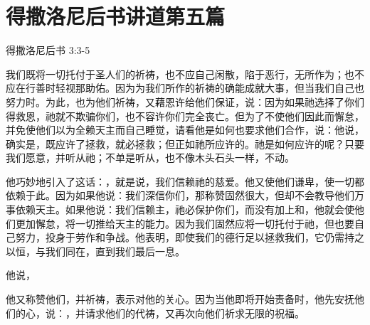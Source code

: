 

\section{得撒洛尼后书讲道第五篇}

得撒洛尼后书 3:3-5\par

\par

我们既将一切托付于圣人们的祈祷，也不应自己闲散，陷于恶行，无所作为；也不应在行善时轻视那助佑。因为为我们所作的祈祷的确能成就大事，但当我们自己也努力时。为此，也为他们祈祷，又藉恩许给他们保证，说：因为如果祂选择了你们得救恩，祂就不欺骗你们，也不容许你们完全丧亡。但为了不使他们因此而懈怠，并免使他们以为全赖天主而自己睡觉，请看他是如何也要求他们合作，说：他说，确实是，既应许了拯救，就必拯救；但正如祂所应许的。祂是如何应许的呢？只要我们愿意，并听从祂；不单是听从，也不像木头石头一样，不动。\par

他巧妙地引入了这话：，就是说，我们信赖祂的慈爱。他又使他们谦卑，使一切都依赖于此。因为如果他说：我们深信你们，那称赞固然很大，但却不会教导他们万事依赖天主。如果他说：我们信赖主，祂必保护你们，而没有加上和，他就会使他们更加懈怠，将一切推给天主的能力。因为我们固然应将一切托付于祂，但也要自己努力，投身于劳作和争战。他表明，即使我们的德行足以拯救我们，它仍需持之以恒，与我们同在，直到我们最后一息。\par

他说，\par

他又称赞他们，并祈祷，表示对他的关心。因为当他即将开始责备时，他先安抚他们的心，说：，并请求他们的代祷，又再次向他们祈求无限的祝福。\par

